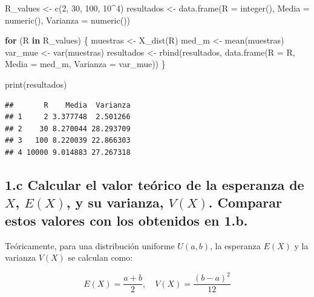 \documentclass[
]{article}
\newenvironment{Shaded}{}{}
\newcommand{\AttributeTok}[1]{\textcolor[rgb]{0.49,0.56,0.16}{#1}}
\newcommand{\ControlFlowTok}[1]{\textcolor[rgb]{0.00,0.44,0.13}{\textbf{#1}}}
\newcommand{\DecValTok}[1]{\textcolor[rgb]{0.25,0.63,0.44}{#1}}
\newcommand{\FunctionTok}[1]{\textcolor[rgb]{0.02,0.16,0.49}{#1}}
\newcommand{\NormalTok}[1]{#1}
\newcommand{\OtherTok}[1]{\textcolor[rgb]{0.00,0.44,0.13}{#1}}
\newcommand{\SpecialCharTok}[1]{\textcolor[rgb]{0.25,0.44,0.63}{#1}}
\begin{document}
\begin{Shaded}
\begin{Highlighting}[]
\NormalTok{R\_values }\OtherTok{\textless{}{-}} \FunctionTok{c}\NormalTok{(}\DecValTok{2}\NormalTok{, }\DecValTok{30}\NormalTok{, }\DecValTok{100}\NormalTok{, }\DecValTok{10}\SpecialCharTok{\^{}}\DecValTok{4}\NormalTok{)}
\NormalTok{resultados }\OtherTok{\textless{}{-}} \FunctionTok{data.frame}\NormalTok{(}\AttributeTok{R =} \FunctionTok{integer}\NormalTok{(), }\AttributeTok{Media =} \FunctionTok{numeric}\NormalTok{(), }\AttributeTok{Varianza =} \FunctionTok{numeric}\NormalTok{())}

\ControlFlowTok{for}\NormalTok{ (R }\ControlFlowTok{in}\NormalTok{ R\_values) \{}
\NormalTok{  muestras }\OtherTok{\textless{}{-}} \FunctionTok{X\_dist}\NormalTok{(R)}
\NormalTok{  med\_m }\OtherTok{\textless{}{-}} \FunctionTok{mean}\NormalTok{(muestras)}
\NormalTok{  var\_mue }\OtherTok{\textless{}{-}} \FunctionTok{var}\NormalTok{(muestras)}
\NormalTok{  resultados }\OtherTok{\textless{}{-}} \FunctionTok{rbind}\NormalTok{(resultados, }\FunctionTok{data.frame}\NormalTok{(}\AttributeTok{R =}\NormalTok{ R, }\AttributeTok{Media =}\NormalTok{ med\_m, }\AttributeTok{Varianza =}\NormalTok{ var\_mue))}
\NormalTok{\}}

\FunctionTok{print}\NormalTok{(resultados)}
\end{Highlighting}
\end{Shaded}

\begin{verbatim}
##       R    Media  Varianza
## 1     2 3.377748  2.501266
## 2    30 8.270044 28.293709
## 3   100 8.220039 22.866303
## 4 10000 9.014883 27.267318
\end{verbatim}

\subsection{\texorpdfstring{1.c Calcular el valor teórico de la
esperanza de \(X\), \(E(X)\), y su varianza, \(V(X)\). Comparar estos
valores con los obtenidos en
1.b.}{1.c Calcular el valor teórico de la esperanza de X, E(X), y su varianza, V(X). Comparar estos valores con los obtenidos en 1.b.}}\label{c-calcular-el-valor-teuxf3rico-de-la-esperanza-de-x-ex-y-su-varianza-vx.-comparar-estos-valores-con-los-obtenidos-en-1.b.}

Teóricamente, para una distribución uniforme \(U(a, b)\), la esperanza
\(E(X)\) y la varianza \(V(X)\) se calculan como:

\[
E(X) = \frac{a + b}{2}, \quad V(X) = \frac{(b - a)^2}{12}
\]
\end{document}
